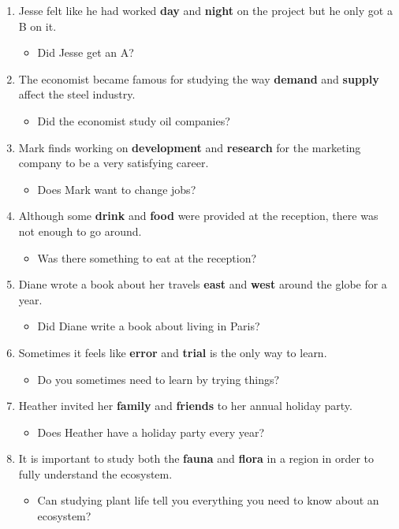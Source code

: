 \documentclass[authoryear]{elsarticle}
\begin{document}
\begin{enumerate}
\item Jesse felt like he had worked \textbf{day} and \textbf{night} on the project but he only got a B on it.	\begin{itemize} \item Did Jesse get an A?\end{itemize}
\item The economist became famous for studying the way \textbf{demand} and \textbf{supply} affect the steel industry.	\begin{itemize} \item Did the economist study oil companies?\end{itemize}
\item Mark finds working on \textbf{development} and \textbf{research} for the marketing company to be a very satisfying career.	\begin{itemize} \item Does Mark want to change jobs?\end{itemize}
\item Although some \textbf{drink} and \textbf{food} were provided at the reception, there was not enough to go around.	\begin{itemize} \item Was there something to eat at the reception?\end{itemize}
\item Diane wrote a book about her travels \textbf{east} and \textbf{west} around the globe for a year.	\begin{itemize} \item Did Diane write a book about living in Paris?\end{itemize}
\item Sometimes it feels like \textbf{error} and \textbf{trial} is the only way to learn.	\begin{itemize} \item Do you sometimes need to learn by trying things?\end{itemize}
\item Heather invited her \textbf{family} and \textbf{friends} to her annual holiday party.	\begin{itemize} \item Does Heather have a holiday party every year?\end{itemize}
\item It is important to study both the \textbf{fauna} and \textbf{flora} in a region in order to fully understand the ecosystem.	\begin{itemize} \item Can studying plant life tell you everything you need to know about an ecosystem?\end{itemize}

\end{enumerate}
\end{document}
